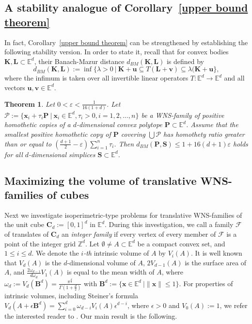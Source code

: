 \documentclass[12pt]{article}
\newtheorem{thm}{Theorem}
\newcommand{\xx}{\mathbf{x}}
\newcommand{\Ee}{{\mathbb E}}
\newcommand{\C}{\mathbf{C}}
\begin{document}
\subsection{A stability analogue of Corollary~\ref{upper bound theorem}}

In fact, Corollary~\ref{upper bound theorem} can be strengthened by establishing the following stability version. In order to state it, recall that for convex bodies $\mathbf{K}, \mathbf{L} \subset \Ee^d$, their Banach-Mazur distance $d_{BM}(\mathbf{K}, \mathbf{L})$ is defined by 
$$
d_{BM}(\mathbf{K}, \mathbf{L}):=\inf\{\lambda>0\ |\ \mathbf{K}+\mathbf{u}\subseteq T(\mathbf{L}+\mathbf{v})\subseteq \lambda(\mathbf{K}+\mathbf{u}\},
$$
where the infimum is taken over all invertible linear operators $T: \Ee^d\to \Ee^d$ and all vectors $\mathbf{u}, \mathbf{v}\in \Ee^d$.

\begin{thm}\label{thm:WNSstability}
Let $0 < \varepsilon < \frac{1}{16(1+d)}$. Let $\mathcal{P} := \{ \xx_i + \tau_i \mathbf{P}\ |\  \xx_i\in \Ee^d, \tau_i>0, i=1,2,\ldots, n\}$ be a WNS-family of positive homothetic copies of a $d$-dimensional convex polytope $\mathbf{P} \subset \Ee^d$. Assume that the smallest positive homothetic copy of $\mathbf{P}$ covering $\bigcup \mathcal{P}$ has homothety ratio greater than or equal to $\left( \frac{d+1}{2} - \varepsilon \right) \sum_{i=1}^n \tau_i$. Then $d_{BM}(\mathbf{P},\mathbf{S}) \leq 1+16(d+1) \varepsilon$ holds for all $d$-dimensional simplices $\mathbf{S}\subset \Ee^d$.
\end{thm}

\subsection{Maximizing the volume of translative WNS-families of cubes}\label{sec:linfty}

Next we investigate isoperimetric-type problems for translative WNS-families of the unit cube $\C_d := [0,1]^d$ in $\Ee^d$.
During this investigation, we call a family $\mathcal{F}$ of translates of $\C_d$ an \emph{integer family} if every vertex of every member of $\mathcal{F}$ is a point of the integer grid $\mathbb{Z}^d$.
Let $\emptyset\neq A\subset\Ee^d$ be a compact convex set, and $1\leq i\leq d$. We denote the {\it $i$-th} intrinsic volume of $A$ by $V_i(A)$. It is well known that $V_d(A)$ is the $d$-dimensional 
volume of $A$, $2V_{d-1}(A)$ is the surface area of $A$, and $\frac{2\omega_{d-1}}{d\omega_d}V_1(A)$ is equal to the mean width of $A$, where $\omega_d:=V_d(\mathbf{B}^d)=\frac{\pi^{\frac{d}{2}}}{\Gamma(1+\frac{d}{2})}$ with $\mathbf{B}^d:=\{\mathbf{x}\in\Ee^d \  | \|\mathbf{x}\|\leq 1\}$. For properties of intrinsic volumes, including Steiner's formula
$V_d\left(A+\epsilon\mathbf{B}^d\right)=\sum_{i=0}^{d}\omega_{d-i}V_i(A)\epsilon^{d-i}$, where $\epsilon >0$ and $V_0(A):=1$, we refer the interested reader to \cite{Sch14}. Our main result is the following. 
\end{document}
